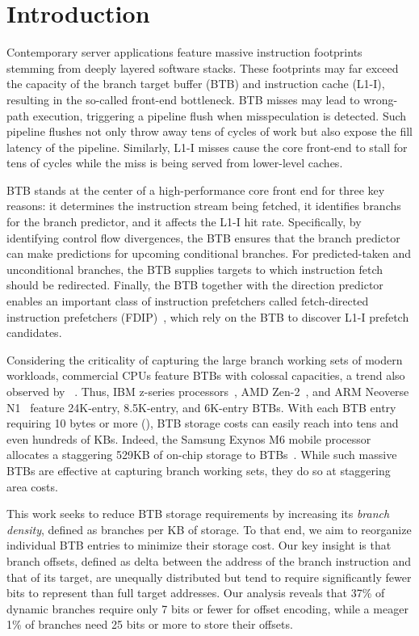 \section{Introduction}
\label{cal:sec::intro}

Contemporary server applications feature massive instruction footprints stemming from deeply layered software stacks. These footprints may far exceed the capacity of the branch target buffer (BTB) and instruction cache (L1-I), resulting in the so-called front-end bottleneck. BTB misses may lead to wrong-path execution, triggering a pipeline flush when misspeculation is detected. Such pipeline flushes not only throw away tens of cycles of work but also expose the fill latency of the pipeline. Similarly, L1-I misses cause the core front-end to stall for tens of cycles while the miss is being served from lower-level caches. 

BTB stands at the center of a high-performance core front end for three key reasons: it determines the instruction stream being fetched, it identifies branchs for the branch predictor, and it affects the L1-I hit rate. Specifically, by identifying control flow divergences, the BTB ensures that the branch predictor can make predictions for upcoming conditional branches. For predicted-taken and unconditional branches, the BTB supplies targets to which instruction fetch should be redirected. Finally, the BTB together with the direction predictor enables an important class of instruction prefetchers called fetch-directed instruction prefetchers (FDIP)~\cite{fdip, boomerang, shotgun}, which rely on the BTB to discover L1-I prefetch candidates. 

Considering the criticality of capturing the large branch working sets of modern workloads, commercial CPUs feature BTBs with colossal capacities, a trend also observed by ~\cite{rebase}. Thus, IBM z-series processors~\cite{IBMz}, AMD Zen-2~\cite{zen2}, and ARM Neoverse N1~\cite{neoverse} feature 24K-entry, 8.5K-entry, and 6K-entry BTBs. With each BTB entry requiring 10 bytes or more (), BTB storage costs can easily reach into tens and even hundreds of KBs. Indeed, the Samsung Exynos M6 mobile processor allocates a staggering 529KB of on-chip storage to BTBs~\cite{exynos}. While such massive BTBs are effective at capturing branch working sets, they do so at staggering area costs.

This work seeks to reduce BTB storage requirements by increasing its {\em branch density}, defined as branches per KB of storage. To that end, we aim to reorganize individual BTB entries to minimize their storage cost. Our key insight is that branch offsets, defined as delta between the address of the branch instruction and that of its target, are unequally distributed but tend to require significantly fewer bits to represent than full target addresses. Our analysis reveals that 37\% of dynamic branches require only 7 bits or fewer for offset encoding, while a meager 1\% of branches need 25 bits or more to store their offsets. 

